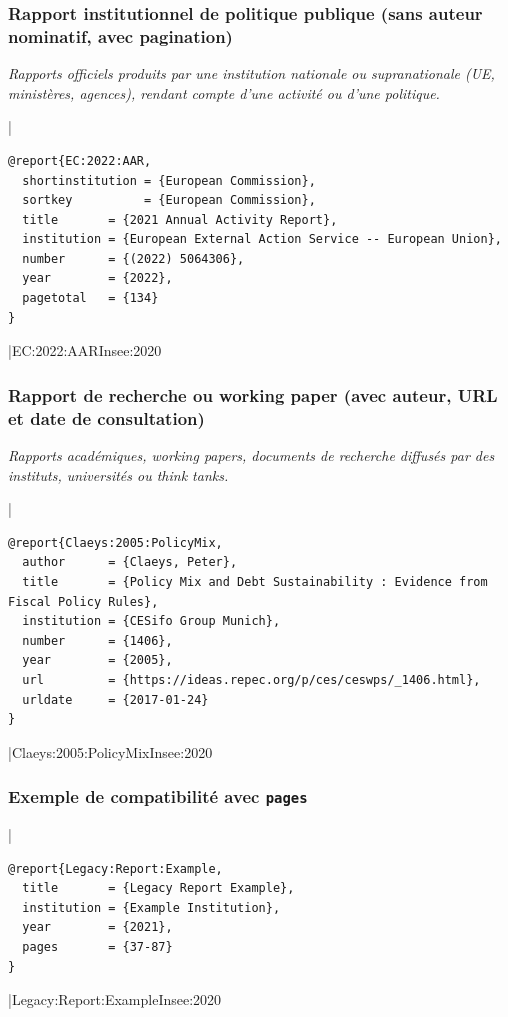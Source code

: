 \documentclass{article}
\begin{document}
\subsubsection{Rapport institutionnel de politique publique (sans auteur nominatif, avec pagination)}

\emph{Rapports officiels produits par une institution nationale ou supranationale (UE, ministères, agences), rendant compte d'une activité ou d'une politique.}

|
\begin{verbatim}
@report{EC:2022:AAR,
  shortinstitution = {European Commission},
  sortkey          = {European Commission},
  title       = {2021 Annual Activity Report},
  institution = {European External Action Service -- European Union},
  number      = {(2022) 5064306},
  year        = {2022},
  pagetotal   = {134}
}
\end{verbatim}
|{EC:2022:AAR}{Insee:2020}

\subsubsection{Rapport de recherche ou working paper (avec auteur, URL et date de consultation)}

\emph{Rapports académiques, working papers, documents de recherche diffusés par des instituts, universités ou think tanks.}

|
\begin{verbatim}
@report{Claeys:2005:PolicyMix,
  author      = {Claeys, Peter},
  title       = {Policy Mix and Debt Sustainability : Evidence from Fiscal Policy Rules},
  institution = {CESifo Group Munich},
  number      = {1406},
  year        = {2005},
  url         = {https://ideas.repec.org/p/ces/ceswps/_1406.html},
  urldate     = {2017-01-24}
}
\end{verbatim}
|{Claeys:2005:PolicyMix}{Insee:2020}

\subsubsection{Exemple de compatibilité avec \texttt{pages}}

|
\begin{verbatim}
@report{Legacy:Report:Example,
  title       = {Legacy Report Example},
  institution = {Example Institution},
  year        = {2021},
  pages       = {37-87}
}
\end{verbatim}
|{Legacy:Report:Example}{Insee:2020}
\end{document}
